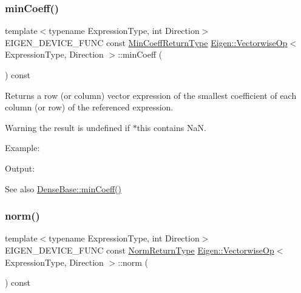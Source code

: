 \subsubsection{\texorpdfstring{minCoeff()}{minCoeff()}}
{\footnotesize\ttfamily template$<$typename Expression\+Type, int Direction$>$ \\
E\+I\+G\+E\+N\+\_\+\+D\+E\+V\+I\+C\+E\+\_\+\+F\+U\+NC const \mbox{\hyperlink{class_eigen_1_1_partial_redux_expr}{Min\+Coeff\+Return\+Type}} \mbox{\hyperlink{class_eigen_1_1_vectorwise_op}{Eigen\+::\+Vectorwise\+Op}}$<$ Expression\+Type, Direction $>$\+::min\+Coeff (\begin{DoxyParamCaption}{ }\end{DoxyParamCaption}) const\hspace{0.3cm}{\ttfamily [inline]}}

\begin{DoxyReturn}{Returns}
a row (or column) vector expression of the smallest coefficient of each column (or row) of the referenced expression.
\end{DoxyReturn}
\begin{DoxyWarning}{Warning}
the result is undefined if {\ttfamily $\ast$this} contains NaN.
\end{DoxyWarning}
Example\+: 
\begin{DoxyCodeInclude}{0}
\end{DoxyCodeInclude}
 Output\+: 
\begin{DoxyVerbInclude}
\end{DoxyVerbInclude}


\begin{DoxySeeAlso}{See also}
\mbox{\hyperlink{class_eigen_1_1_dense_base_a6634944be3d4fef551b57ffad30467f2}{Dense\+Base\+::min\+Coeff()}} 
\end{DoxySeeAlso}
\mbox{\label{class_eigen_1_1_vectorwise_op_a1c098483dfb35329f11b769cb5c1b6c1}} 
\subsubsection{\texorpdfstring{norm()}{norm()}}
{\footnotesize\ttfamily template$<$typename Expression\+Type, int Direction$>$ \\
E\+I\+G\+E\+N\+\_\+\+D\+E\+V\+I\+C\+E\+\_\+\+F\+U\+NC const \mbox{\hyperlink{class_eigen_1_1_partial_redux_expr}{Norm\+Return\+Type}} \mbox{\hyperlink{class_eigen_1_1_vectorwise_op}{Eigen\+::\+Vectorwise\+Op}}$<$ Expression\+Type, Direction $>$\+::norm (\begin{DoxyParamCaption}{ }\end{DoxyParamCaption}) const\hspace{0.3cm}{\ttfamily [inline]}}

